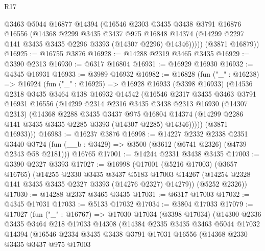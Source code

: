 \begin{lexlean}{R17}
\begin{coremodule}
          @3463
          @5044
          @16877
          @14394
          (@16546
            @2303
            @3435
            @3438
            @3791
            @16876
            @16556
            (@14368
              @2299
              @3435
              @3437
              @975
              @16848
              @14374
              (@14299 @2297 @141 @3435 @3435 @2296 @3393 (@14307 @2296) @14346)))))
      (@3871 @16879))
@16925 := @16755 @3876
@16928 := @14288 @2319 @3465 @3435
@16929 := @3390 @2313
@16930 := @6317 @16804
@16931 := @16929 @16930
@16932 := @4345 @16931
@16933 := @3989 @16932
@16982 := @16828
    (fun ("_" : @16238) =>
    @16924
      (fun ("_" : @16925) =>
      @16928
        @16933
        (@3398 @16933)
        (@14536
          @2318
          @3435
          @3464
          @138
          @16932
          @14542
          (@16546
            @2317
            @3435
            @3463
            @3791
            @16931
            @16556
            (@14299
              @2314
              @2316
              @3435
              @3438
              @2313
              @16930
              (@14307 @2313)
              (@14368
                @2288
                @3435
                @3437
                @975
                @16804
                @14374
                (@14299 @2286 @141 @3435 @3435 @2285 @3393 (@14307 @2285) @14346)))))
        (@3871 @16933)))
@16983 := @16237 @3876
@16998 := @14227
    @2332
    @2338
    @2351
    @3440
    @3724
    (fun (__b : @3429) => @3500 (@3612 (@6741 @2326) (@4739 @2343 @58 @2181)))
    @16765
@17001 := @14244 @2331 @3438 @3435
@17003 := @3390 @2327 @3393
@17027 := @16998
    (@17001
      (@5216 @17003)
      (@3657 @16765)
      (@14255
        @2330
        @3435
        @3437
        @5183
        @17003
        @14267
        (@14254 @2328 @141 @3435 @3435 @2327 @3393 (@14276 @2327) @14279))
      (@5252 @2326))
@17030 := @14288 @2337 @3465 @3435
@17031 := @6317 @17003
@17032 := @4345 @17031
@17033 := @5133 @17032
@17034 := @3804 @17033
@17079 := @17027
    (fun ("_" : @16767) =>
    @17030
      @17034
      (@3398 @17034)
      (@14300
        @2336
        @3435
        @3464
        @218
        @17033
        @14308
        (@14384
          @2335
          @3435
          @3463
          @5044
          @17032
          @14394
          (@16546
            @2334
            @3435
            @3438
            @3791
            @17031
            @16556
            (@14368
              @2330
              @3435
              @3437
              @975
              @17003

\end{coremodule}
\end{lexlean}
